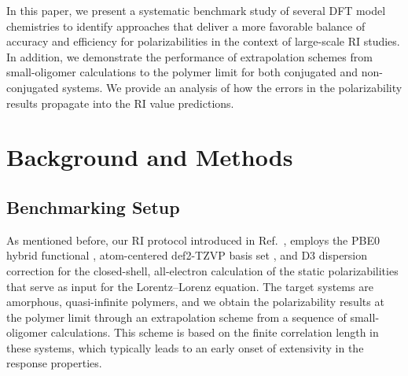 In this paper, we present a systematic benchmark study of several DFT model chemistries to identify approaches that deliver a more favorable balance of accuracy and efficiency for polarizabilities in the context of large-scale RI studies. In addition, we demonstrate the performance of extrapolation schemes from small-oligomer calculations to the polymer limit for both conjugated and non-conjugated systems. We provide an analysis of how the errors in the polarizability results propagate into the RI value predictions. 





\section{Background and Methods}
\label{sec:methods}

\subsection{Benchmarking Setup}
\label{subsec:benchmarking}
As mentioned before, our RI protocol introduced in Ref.\ \cite{Afzal2018a}, employs the PBE0 hybrid functional \cite{Adamo1999}, atom-centered def2-TZVP basis set \cite{Weigend2005}, and D3 dispersion correction \cite{Grimme2010} for the closed-shell, all-electron calculation of the static polarizabilities that serve as input for the Lorentz--Lorenz equation. The target systems are amorphous, quasi-infinite polymers, and we obtain the polarizability results at the polymer limit through an extrapolation scheme from a sequence of small-oligomer calculations. This scheme is based on the finite correlation length in these systems, which typically leads to an early onset of extensivity in the response properties. 

